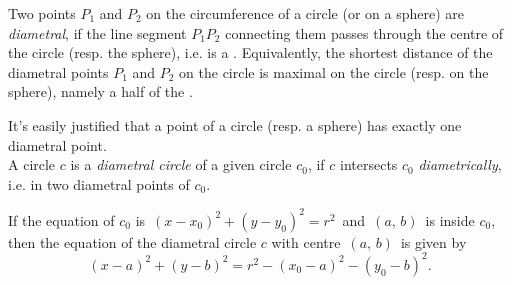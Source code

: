 \documentclass[12pt]{article}
\theoremstyle{definition}
\begin{document}
Two points $P_1$ and $P_2$ on the circumference of a circle (or on a sphere) are {\em diametral}, if the line segment $P_1P_2$ connecting them passes through the centre of the circle (resp. the sphere), i.e. is a . Equivalently, the shortest distance of the diametral points $P_1$ and $P_2$ on the circle is maximal on the circle (resp. on the sphere), namely a half of the .

It's easily justified that a point of a circle (resp. a sphere) has exactly one diametral point.\\

A circle $c$ is a {\em diametral circle} of a given circle $c_0$, if $c$ intersects $c_0$ {\em diametrically}, i.e. in two diametral points of $c_0$.

If the equation of $c_0$ is\, $(x-x_0)^2+(y-y_0)^2 = r^2$\, and\, $(a,\,b)$\, is inside $c_0$, then the equation of the diametral circle $c$ with centre\, $(a,\,b)$\, is given by
$$(x-a)^2+(y-b)^2 = r^2-(x_0-a)^2-(y_0-b)^2.$$ 
\end{document}
